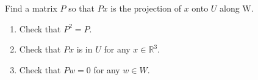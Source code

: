 \documentclass[11pt]{article}
\begin{document}
\begin{enumerate}
{	\vspace{0.2in}
	
	Find a matrix $P$ so that $Px$ is the projection of $x$ onto $U$ along W.  
	\begin{enumerate}
		\item {Check that $P^2=P$.}
		\item {Check that $Px$ is in $U$ for any $x\in\mathbb{R}^3$.}
		\item {Check that $Pw=0$ for any $w\in W$.}
\end{enumerate}
}


\end{enumerate}

\vspace{0.1in}
\end{document}
